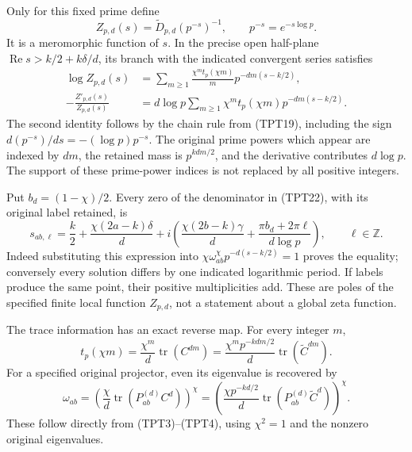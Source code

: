 Only for this fixed prime define
\begin{equation}\tag{TPT22}
 Z_{p,d}(s)=\widetilde D_{p,d}(p^{-s})^{-1},
 \qquad p^{-s}=e^{-s\log p}.
\end{equation}
It is a meromorphic function of $s$. In the precise open half-plane
$\operatorname{Re}s>k/2+k\delta/d$, its branch with the indicated
convergent series satisfies
\begin{equation}\tag{TPT23}
 \begin{split}
 \log Z_{p,d}(s)
   &=\sum_{m\ge1}\frac{\chi^m t_p(\chi m)}m
                                  p^{-dm(s-k/2)},\\
 -\frac{Z'_{p,d}(s)}{Z_{p,d}(s)}
   &=d\log p\sum_{m\ge1}\chi^m t_p(\chi m)
                                  p^{-dm(s-k/2)}.
 \end{split}
\end{equation}
The second identity follows by the chain rule from (TPT19), including
the sign $d(p^{-s})/ds=-(\log p)p^{-s}$.
The original prime powers which appear are indexed by $dm$, the
retained mass is $p^{kdm/2}$, and the derivative contributes $d\log p$.
The support of these prime-power indices is not replaced by all
positive integers.

Put $b_d=(1-\chi)/2$. Every zero of the denominator in (TPT22), with
its original label retained, is
\begin{equation}\tag{TPT24}
 s_{ab,\ell}=\frac{k}{2}+\frac{\chi(2a-k)\delta}{d}
  +i\left(\frac{\chi(2b-k)\gamma}{d}
          +\frac{\pi b_d+2\pi\ell}{d\log p}\right),
 \qquad \ell\in\mathbb Z.
\end{equation}
Indeed substituting this expression into
$\chi\omega_{ab}^{\chi}p^{-d(s-k/2)}=1$ proves the equality;
conversely every solution differs by one indicated logarithmic
period. If labels produce the same point, their positive
multiplicities add. These are poles of the specified finite local
function $Z_{p,d}$, not a statement about a global zeta function.

The trace information has an exact reverse map. For every integer $m$,
\begin{equation}\tag{TPT25}
 t_p(\chi m)=\frac{\chi^m}{d}\operatorname{tr}(C^{dm})
    =\frac{\chi^m p^{-kdm/2}}d
                               \operatorname{tr}(\widetilde C^{dm}).
\end{equation}
For a specified original projector, even its eigenvalue is recovered by
\begin{equation}\tag{TPT26}
 \omega_{ab}=
   \left(\frac{\chi}{d}\operatorname{tr}(P_{ab}^{(d)}C^d)\right)^\chi
 =\left(\frac{\chi p^{-kd/2}}d
              \operatorname{tr}(P_{ab}^{(d)}\widetilde C^d)\right)^\chi.
\end{equation}
These follow directly from (TPT3)--(TPT4), using $\chi^2=1$ and the
nonzero original eigenvalues.

